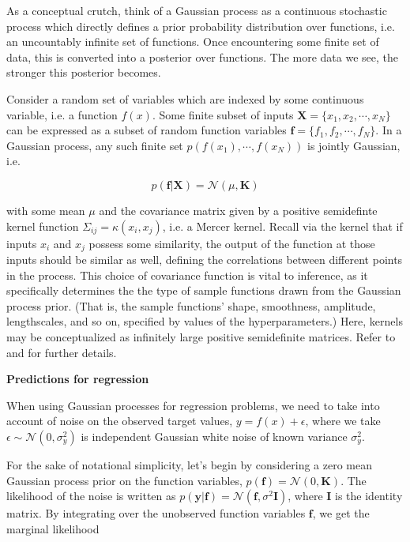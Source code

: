 \documentclass[12pt]{article}
\begin{document}
As a conceptual crutch, think of a Gaussian process as a continuous stochastic process which directly defines a prior probability distribution over functions, i.e. an uncountably infinite set of functions. Once encountering some finite set of data, this is converted into a posterior over functions. The more data we see, the stronger this posterior becomes. 

Consider a random set of variables which are indexed by some continuous variable, i.e. a function $f(x)$. Some finite subset of inputs $\textbf{X}=\{x_1, x_2, \cdots, x_N\}$ can be expressed as a subset of random function variables $\textbf{f}=\{f_1, f_2, \cdots, f_N\}$. In a Gaussian process, any such finite set $p(f(x_1), \cdots, f(x_N))$ is jointly Gaussian, i.e. 

\begin{equation}
p(\textbf{f}|\textbf{X})=\mathcal{N}(\mu, \textbf{K})
\end{equation}

with some mean $\mu$ and the covariance matrix given by a positive semidefinte kernel function $\Sigma_{ij}=\kappa(x_i,x_j)$, i.e. a Mercer kernel. Recall via the kernel that if inputs $x_i$ and $x_j$ possess some similarity, the output of the function at those inputs should be similar as well, defining the correlations between different points in the process. This choice of covariance function is vital to inference, as it specifically determines the the type of sample functions drawn from the Gaussian process prior. (That is, the sample functions' shape, smoothness, amplitude, lengthscales, and so on, specified by values of the hyperparameters.) Here, kernels may be conceptualized as infinitely large positive semidefinite matrices. Refer to \cite{Rasmussen} and \cite{HoggForemanMackey} for further details. 

\textbf{Predictions for regression}

When using Gaussian processes for regression problems, we need to take into account of noise on the observed target values, $y = f(x) +\epsilon$, where we take $\epsilon\sim\mathcal{N}(0,\sigma_y^2)$ is independent Gaussian white noise of known variance $\sigma^2_y$. 

For the sake of notational simplicity, let's begin by considering a zero mean Gaussian process prior on the function variables, $p(\textbf{f})=\mathcal{N}(0,\textbf{K})$. The likelihood of the noise is written as $p(\textbf{y}|\textbf{f})=\mathcal{N}(\textbf{f}, \sigma^2\textbf{I})$, where $\textbf{I}$ is the identity matrix. By integrating over the unobserved function variables $\textbf{f}$, we get the marginal likelihood 
\end{document}
